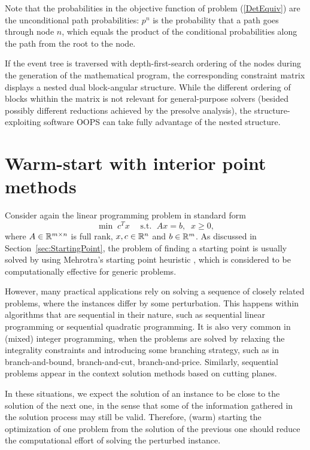 {Note that the probabilities in the objective function of problem 
(\ref{DetEquiv}) are the unconditional path probabilities: $p^n$ is 
the probability that a path goes through node $n$, which equals the 
product of the conditional probabilities along the path from the root 
to the node.

If the event tree is traversed with depth-first-search ordering of the 
nodes during the generation of the mathematical program, the 
corresponding constraint matrix displays a nested dual block-angular 
structure.
%
While the different ordering of blocks whithin the matrix is not 
relevant for general-purpose solvers (besided possibly different 
reductions achieved by the presolve analysis), the 
structure-exploiting software OOPS \cite{GondzioSarkissian} can take 
fully advantage of the nested structure.


%
%
\section{Warm-start with interior point methods}
\label{sec:WarmStart}

Consider again the linear programming problem in standard form
\[
\min\;  c^T x \;\quad \mbox{s.t. }\; Ax = b, \;\; x \ge 0,
\]
where $A \in \mathbb{R}^{m \times n}$ is full rank, 
$x, c \in \mathbb{R}^{n}$ and $b \in \mathbb{R}^{m}$. 
As discussed in Section~\ref{sec:StartingPoint}, the problem of 
finding a starting point is usually solved by using 
Mehrotra's starting point heuristic \cite{Mehrotra92}, which is 
considered to be computationally effective for generic problems.

However, many practical applications rely on solving a sequence 
of closely related problems, where the instances differ by some 
perturbation. This happens within algorithms that are sequential 
in their nature, such as sequential linear programming or
sequential quadratic programming.
It is also very common in (mixed) integer programming, when the
problems are solved by relaxing the integrality constraints and
introducing some branching strategy, such as in branch-and-bound,
branch-and-cut, branch-and-price.
Similarly, sequential problems appear in the context solution 
methods based on cutting planes.

In these situations, we expect the solution of an instance to be 
close to the solution of the next one, in the sense that some of
the information gathered in the solution process may still be valid. 
Therefore, (warm) starting the 
optimization of one problem from the solution of the previous one
should reduce the computational effort of solving the perturbed instance.

}
